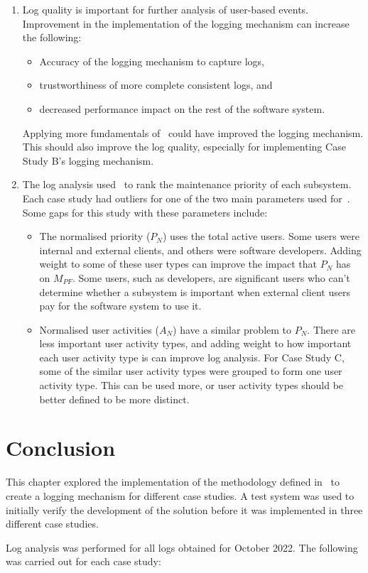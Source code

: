 \begin{enumerate}
	\item Log quality is important for further analysis of user-based events. Improvement in the implementation of the logging mechanism can increase the following:
		\begin{itemize}
			\item Accuracy of the logging mechanism to capture logs,
			\item trustworthiness of more complete consistent logs, and
			\item decreased performance impact on the rest of the software system.
		\end{itemize}
	Applying more fundamentals of~ could have improved the logging mechanism. This should also improve the log quality, especially for implementing Case Study B's logging mechanism.
	\item The log analysis used~ to rank the maintenance priority of each subsystem. Each case study had outliers for one of the two main parameters used for~. Some gaps for this study with these parameters include:
		\begin{itemize}
			\item The normalised priority ($P_N$) uses the total active users. Some users were internal and external clients, and others were software developers. Adding weight to some of these user types can improve the impact that $P_N$ has on $M_{PF}$. Some users, such as developers, are significant users who can't determine whether a subsystem is important when external client users pay for the software system to use it.
			\item Normalised user activities ($A_N$) have a similar problem to $P_N$. There are less important user activity types, and adding weight to how important each user activity type is can improve log analysis. For Case Study C, some of the similar user activity types were grouped to form one user activity type. This can be used more, or user activity types should be better defined to be more distinct.
		\end{itemize}
\end{enumerate}

\section{Conclusion}
This chapter explored the implementation of the methodology defined in~ to create a logging mechanism for different case studies. A test system was used to initially verify the development of the solution before it was implemented in three different case studies. \par Log analysis was performed for all logs obtained for October 2022. The following was carried out for each case study:

